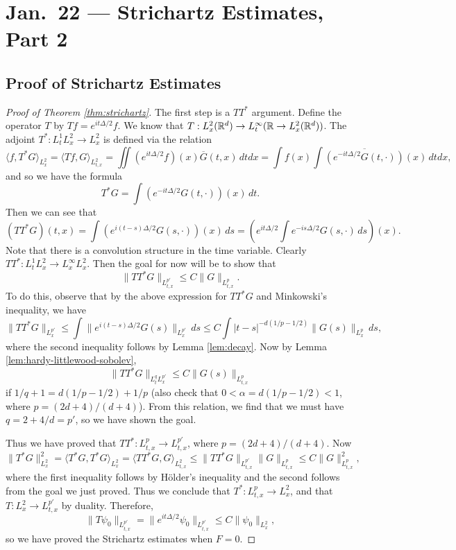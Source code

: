 \chapter{Jan.~22 --- Strichartz Estimates, Part 2}

\section{Proof of Strichartz Estimates}

\begin{proof}[Proof of Theorem \ref{thm:strichartz}]
  The first step is a $TT^*$ argument. Define the
  operator $T$ by $Tf = e^{it \Delta / 2} f$. We know
  that $T : L^2_x(\mathbb{R}^d) \to L^\infty_t(\mathbb{R} \to L^2_x(\mathbb{R}^d))$.
  The adjoint $T^* : L^1_t L^2_x \to L^2_x$ is defined
  via the relation
  \[
    \langle f, T^* G \rangle_{L^2_x}
    = \langle Tf, G \rangle_{L^2_{t, x}}
    = \iint (e^{it \Delta / 2} f)(x) \overline{G}(t, x)\, dt dx
    = \int f(x) \int \overline{(e^{-it \Delta / 2} G(t, \cdot))}(x)\, dt dx,
  \]
  and so we have the formula
  \[
    T^* G = \int (e^{-it \Delta / 2} G(t, \cdot))(x)\, dt.
  \]
  Then we can see that
  \[
    (TT^* G)(t, x)
    = \int (e^{i(t - s) \Delta / 2} G(s, \cdot))(x)\, ds
    = \left(e^{i t \Delta / 2} \int e^{-is \Delta / 2} G(s, \cdot)\, ds\right)(x).
  \]
  Note that there is a convolution structure in the
  time variable. Clearly $TT^* : L^1_t L^2_x \to L^\infty_x L^2_x$.
  Then the goal for now will be to show that
  \[
    \|TT^* G\|_{L^{p'}_{t, x}} \le C \|G\|_{L^p_{t, x}}.
  \]
  To do this, observe that by the above expression for
  $TT^* G$ and Minkowski's inequality, we have
  \[
    \|TT^* G\|_{L^{p'}_{x}}
    \le \int \|e^{i(t - s) \Delta / 2} G(s)\|_{L^{p'}_x}\, ds
    \le C \int |t - s|^{-d(1 / p - 1 / 2)} \|G(s)\|_{L^p_x}\, ds,
  \]
  where the second inequality follows by
  Lemma \ref{lem:decay}. Now by Lemma \ref{lem:hardy-littlewood-sobolev},
  \[
    \|TT^* G\|_{L^q_t L^{p'}_x}
    \le C \|G(s)\|_{L^p_{t, x}}
  \]
  if $1 / q + 1 = d(1 / p - 1 / 2) + 1 / p$
  (also check that $0 < \alpha = d(1 / p - 1 / 2) < 1$,
  where $p = (2d + 4) / (d + 4)$).
  From this relation, we find that we must have
  $q = 2 + 4 / d = p'$, so we have shown the goal.

  Thus we have proved that $TT^* : L^p_{t, x} \to L^{p'}_{t, x}$, where
  $p = (2d + 4) / (d + 4)$. Now
  \[
    \|T^* G\|^2_{L^2_x} = \langle T^* G, T^* G \rangle_{L^2_x}
    = \langle TT^* G, G \rangle_{L^2_{t, x}}
    \le \|TT^* G\|_{L^{p'}_{t, x}} \|G\|_{L^p_{t, x}}
    \le C \|G\|_{L^p_{t, x}}^2,
  \]
  where the first inequality follows by H\"older's inequality
  and the second follows from the goal we just proved.
  Thus we conclude that $T^* : L^p_{t, x} \to L^2_x$, and
  that $T : L^2_x \to L^{p'}_{t, x}$ by duality.
  Therefore,
  \[
    \|T \psi_0\|_{L^{p'}_{t, x}}
    = \|e^{it \Delta / 2} \psi_0\|_{L^{p'}_{t, x}}
    \le C\|\psi_0\|_{L^2_x},
  \]
  so we have proved the Strichartz estimates when
  $F = 0$.


\end{proof}
